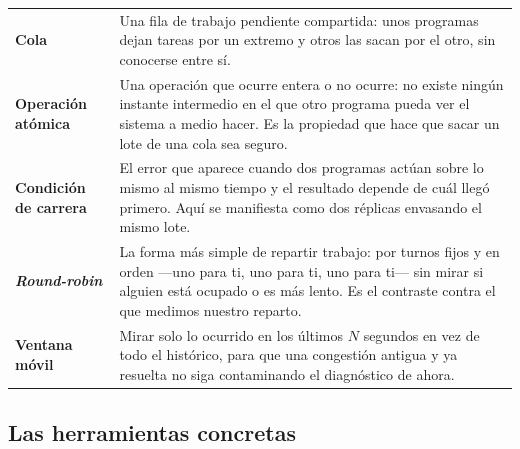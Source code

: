 \documentclass[12pt,a4paper]{article}
\begin{document}
\begin{table}[H]
\begin{tabular}{@{}L{3.05cm} L{12.15cm}@{}}
\addlinespace[2pt]
\textbf{Cola} &
Una fila de trabajo pendiente compartida: unos programas dejan tareas por un
extremo y otros las sacan por el otro, sin conocerse entre sí. \\
\addlinespace[2pt]
\textbf{Operación atómica} &
Una operación que ocurre entera o no ocurre: no existe ningún instante
intermedio en el que otro programa pueda ver el sistema a medio hacer. Es la
propiedad que hace que sacar un lote de una cola sea seguro. \\
\addlinespace[2pt]
\textbf{Condición de carrera} &
El error que aparece cuando dos programas actúan sobre lo mismo al mismo
tiempo y el resultado depende de cuál llegó primero. Aquí se manifiesta como
dos réplicas envasando el mismo lote. \\
\addlinespace[2pt]
\textbf{\emph{Round-robin}} &
La forma más simple de repartir trabajo: por turnos fijos y en orden —uno para
ti, uno para ti, uno para ti— sin mirar si alguien está ocupado o es más lento.
Es el contraste contra el que medimos nuestro reparto. \\
\addlinespace[2pt]
\textbf{Ventana móvil} &
Mirar solo lo ocurrido en los últimos $N$ segundos en vez de todo el
histórico, para que una congestión antigua y ya resuelta no siga contaminando
el diagnóstico de ahora. \\
\bottomrule
\end{tabular}
\end{table}

\subsection{Las herramientas concretas}
\end{document}
